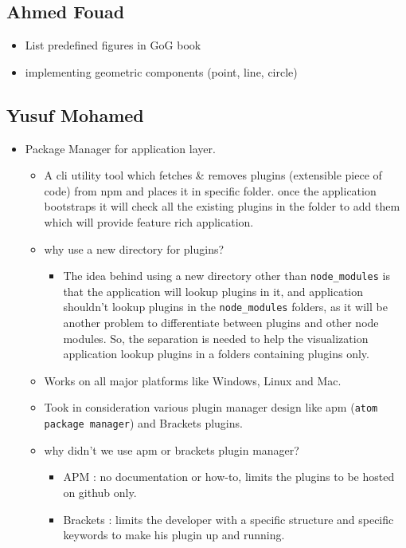 \documentclass[12pt]{article}
\begin{document}
\begin{itemize}
\begin{itemize}
\end{itemize}  
\subsection{Ahmed Fouad}
\begin{itemize}
\item List predefined figures in GoG book
\item implementing geometric components (point, line, circle)
\end{itemize}
\subsection{Yusuf Mohamed}
\begin{itemize}
\item {\Large Package Manager} for application layer.
\begin{itemize}
\item A cli utility tool which fetches \& removes plugins (extensible piece of code) from npm and places it in specific folder. once the application bootstraps it will check all the existing plugins in the folder to add them which will provide feature rich application.
\item why use a new directory for plugins?
\begin{itemize}
\item The idea behind using a new directory other than \texttt{node\_modules} is that the application will lookup plugins in it, and application shouldn't lookup plugins in the \texttt{node\_modules} folders, as it will be another problem to differentiate between plugins and other node modules.
So, the separation is needed to help the visualization application lookup plugins in a folders containing plugins only.
\end{itemize}
\item Works on all major platforms like Windows, Linux and Mac.
\item Took in consideration various plugin manager design like apm (\texttt{atom package manager}) and Brackets plugins.
\item why didn't we use apm or brackets plugin manager?
\begin{itemize}
\item APM : no documentation or how-to, limits the plugins to be hosted on github only.
\item Brackets : limits the developer with a specific structure and specific keywords to make his plugin up and running.
\end{itemize}

\end{itemize}
\end{itemize}
\end{itemize}
\end{document}
